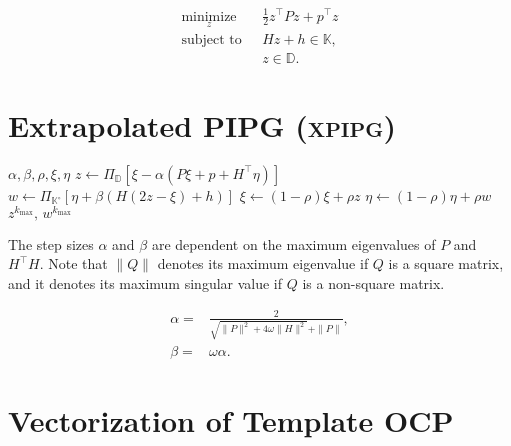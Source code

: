 \documentclass[letterpaper,11pt]{article}
\newcommand{\xpipg}{\textsc{\relsize{-1}x\relsize{1}pipg}}
\begin{document}
\begin{subequations}
\begin{align*}
\underset{z}{\operatorname{minimize}}~~~&~\frac{1}{2}z^\top P  z + p^\top z\\
    \operatorname{subject~to}~~&~Hz + h \in \mathbb{K},\\
    &~z\in\mathbb{D}.    
\end{align*}    
\end{subequations}

\section{Extrapolated PIPG (\xpipg)}

\begin{algorithm}[!htpb]
\caption{Vectorized \xpipg}
\label{alg:xpipg-vec}
\begin{algorithmic}[1]
    \Require $\alpha,\beta,\rho,\xi,\eta$
        \State $z \gets \Pi_{\mathbb{D}}\left[ \xi - \alpha (P\xi + p + H^\top\eta) \right]$
        \State $w \gets \Pi_{\mathbb{K}^\circ}\left[ \eta + \beta ( H (2z-\xi) + h ) \right]$
        \State $\xi \gets (1-\rho)\xi + \rho z$
        \State $\eta \gets (1-\rho)\eta + \rho w$
    \EndFor
    \Ensure $z^{k_{\max}},\,w^{k_{\max}}$
\end{algorithmic}
\end{algorithm}

The step sizes $\alpha$ and $\beta$ are dependent on the maximum eigenvalues of $P$ and $H^\top H$. Note that $\|Q\|$ denotes its maximum eigenvalue if $Q$ is a square matrix, and it denotes its maximum singular value if $Q$ is a non-square matrix.

\begin{subequations}
\begin{align}
    \alpha ={} & \frac{2}{\sqrt{\|P\|^2 + 4\omega\|H\|^2}  + \|P\|},\\
    \beta ={} & \omega\alpha.
\end{align}    
\end{subequations}

\section{Vectorization of Template OCP}
\end{document}
